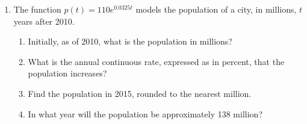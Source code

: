 \documentclass[12pt, oneside]{article}
\begin{document}
\begin{enumerate}
\item The function $p(t)=110e^{0.0325t}$ models the population of a city, in millions, $t$ years after 2010.
\begin{enumerate}
    \item Initially, as of 2010, what is the population in millions?%
        \begin{flushright}[1]\end{flushright}
    \item What is the annual continuous rate, expressed as in percent, that the population increases?%
        \begin{flushright}[1]\end{flushright}
    \item Find the population in 2015, rounded to the nearest million.\\[60pt]
        \begin{flushright}[2]\end{flushright}
    \item In what year will the population be approximately 138 million?
        \begin{flushright}[2]\end{flushright}
\end{enumerate}



\end{enumerate}
\end{document}
